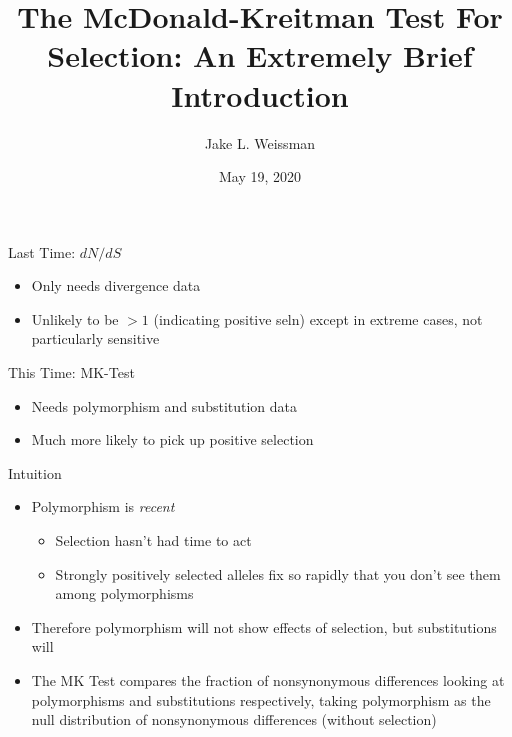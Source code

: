 \documentclass[compress]{beamer}
\title[MK Test]{The McDonald-Kreitman Test For Selection: An Extremely Brief Introduction}
\author[Jake L. Weissman]{Jake L. Weissman}
\date{May 19, 2020}  %
\begin{document}
\contourlength{2pt} %

\begin{frame}
\maketitle
\end{frame}

\begin{frame}{Last Time: $dN/dS$}
\begin{itemize}
\item Only needs divergence data 
\item Unlikely to be $>1$ (indicating positive seln) except in extreme cases, not particularly sensitive
\end{itemize}
\end{frame}


\begin{frame}{This Time: MK-Test}
\begin{itemize}
\item Needs polymorphism and substitution data
\item Much more likely to pick up positive selection
\end{itemize}
\end{frame}

\begin{frame}{Intuition}
\begin{itemize}
\item Polymorphism is \emph{recent}
\begin{itemize}
\item Selection hasn't had time to act
\item Strongly positively selected alleles fix so rapidly that you don't see them among polymorphisms
\end{itemize}
\item Therefore polymorphism will not show effects of selection, but substitutions will
\item The MK Test compares the fraction of nonsynonymous differences looking at polymorphisms and substitutions respectively, taking polymorphism as the null distribution of nonsynonymous differences (without selection)
\end{itemize}
\end{frame}
\end{document}
